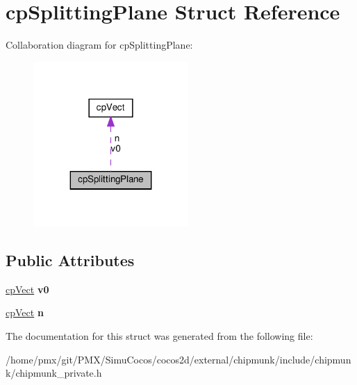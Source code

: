 \hypertarget{structcpSplittingPlane}{}\section{cp\+Splitting\+Plane Struct Reference}
\label{structcpSplittingPlane}


Collaboration diagram for cp\+Splitting\+Plane\+:
\nopagebreak
\begin{figure}[H]
\begin{center}
\leavevmode
\includegraphics[width=167pt]{structcpSplittingPlane__coll__graph}
\end{center}
\end{figure}
\subsection*{Public Attributes}
\begin{DoxyCompactItemize}
\item 
\mbox{\label{structcpSplittingPlane_a7bf5acca120e334f8b492f97dfc018e6}} 
\hyperlink{structcpVect}{cp\+Vect} {\bfseries v0}
\item 
\mbox{\label{structcpSplittingPlane_a06037e7cd8fb72c093d468b699c9f666}} 
\hyperlink{structcpVect}{cp\+Vect} {\bfseries n}
\end{DoxyCompactItemize}


The documentation for this struct was generated from the following file\+:\begin{DoxyCompactItemize}
\item 
/home/pmx/git/\+P\+M\+X/\+Simu\+Cocos/cocos2d/external/chipmunk/include/chipmunk/chipmunk\+\_\+private.\+h\end{DoxyCompactItemize}
